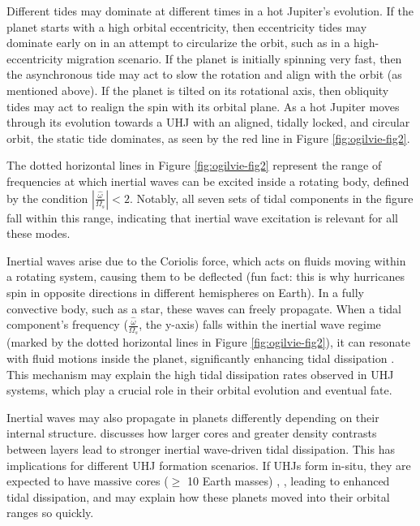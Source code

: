 \documentclass[oneside,12pt]{amsart}
\numberwithin{page}{section}
\begin{document}
Different tides may dominate at different times in a hot Jupiter's evolution. If the planet starts with a high orbital eccentricity, then eccentricity tides may dominate early on in an attempt to circularize the orbit, such as in a high-eccentricity migration scenario. If the planet is initially spinning very fast, then the asynchronous tide may act to slow the rotation and align with the orbit (as mentioned above). If the planet is tilted on its rotational axis, then obliquity tides may act to realign the spin with its orbital plane. As a hot Jupiter moves through its evolution towards a UHJ with an aligned, tidally locked, and circular orbit, the static tide dominates, as seen by the red line in Figure \ref{fig:ogilvie-fig2}.

The dotted horizontal lines in Figure \ref{fig:ogilvie-fig2} represent the range of frequencies at which inertial waves can be excited inside a rotating body, defined by the condition $|\frac{\hat{\omega}}{\Omega_s}| < 2$. Notably, all seven sets of tidal components in the figure fall within this range, indicating that inertial wave excitation is relevant for all these modes.

Inertial waves arise due to the Coriolis force, which acts on fluids moving within a rotating system, causing them to be deflected (fun fact: this is why hurricanes spin in opposite directions in different hemispheres on Earth). In a fully convective body, such as a star, these waves can freely propagate. When a tidal component’s frequency ($\frac{\hat{\omega}}{\Omega_s}$, the y-axis) falls within the inertial wave regime (marked by the dotted horizontal lines in Figure \ref{fig:ogilvie-fig2}), it can resonate with fluid motions inside the planet, significantly enhancing tidal dissipation \citep{ogilvie2014tidal}. This mechanism may explain the high tidal dissipation rates observed in UHJ systems, which play a crucial role in their orbital evolution and eventual fate.

Inertial waves may also propagate in planets differently depending on their internal structure. \citet{ogilvie2014tidal} discusses how larger cores and greater density contrasts between layers lead to stronger inertial wave-driven tidal dissipation. This has implications for different UHJ formation scenarios. If UHJs form in-situ, they are expected to have massive cores ($\geq$ 10 Earth masses) \citep{fortney2021hotjupiters}, \citep{dawson2018origins}, leading to enhanced tidal dissipation, and may explain how these planets moved into their orbital ranges so quickly.
\end{document}
